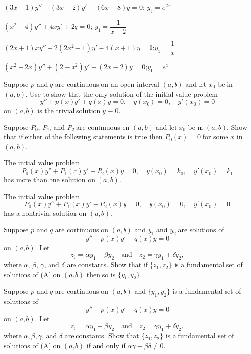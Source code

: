 \begin{exerciselist}
\item\label{exer:5.1.20}$(3x-1)y''-(3x+2)y'-(6x-8)y=0$;  \quad  $y_1=e^{2x}$

\item\label{exer:5.1.21}$(x^2-4)y''+4xy'+2y=0$;  \quad  $y_1=\dfrac{1}{x-2}$

\item\label{exer:5.1.22}$(2x+1)xy''-2(2x^2-1)y'-4(x+1)y=0$;\quad  $y_1=\dfrac{1}{x}$

\item\label{exer:5.1.23}$(x^2-2x)y''+(2-x^2)y'+(2x-2)y=0$;\quad  $y_1=e^x$

\item\label{exer:5.1.24}Suppose  $p$ and $q$ are continuous on an open interval $(a,b)$
and let $x_0$ be in $(a,b)$.
Use    to show that
 the only solution of the initial value problem
\[
y''+p(x)y'+q(x)y=0,\quad  y(x_0)=0,\quad y'(x_0)=0
\]
on  $(a,b)$ is the trivial solution $y\equiv0$.

\item\label{exer:5.1.25}Suppose $P_0$, $P_1$, and $P_2$ are continuous on  $(a,b)$
and let $x_0$ be in  $(a,b)$. Show that if either of
the following statements is true then $P_0(x)=0$ for some $x$ in
$(a,b)$.
\begin{alist}
\item %
The initial value problem
\[
P_0(x)y''+P_1(x)y'+P_2(x)y=0,\quad  y(x_0)=k_0,\quad y'(x_0)=k_1
\]
has more than one  solution on  $(a,b)$.
\item %
The initial value problem
\[
P_0(x)y''+P_1(x)y'+P_2(x)y=0,\quad y(x_0)=0,\quad y'(x_0)=0
\]
has a nontrivial solution on  $(a,b)$.
\end{alist}

\item\label{exer:5.1.26}Suppose  $p$ and $q$ are continuous  on  $(a,b)$ and
 $y_1$ and $y_2$ are solutions of
\[
y''+p(x)y'+q(x)y=0\tag{A}
\]
on  $(a,b)$. Let
\[
z_1=\alpha y_1+\beta y_2\quad\text{and}\quad z_2=\gamma y_1+\delta
y_2,
\]
where $\alpha$, $\beta$, $\gamma$, and $\delta$ are constants.
Show that if  $\{z_1,z_2\}$
is a fundamental set of solutions of
(A) on $(a,b)$ then so is  $\{y_1,y_2\}$.

\item\label{exer:5.1.27}Suppose $p$ and $q$ are continuous on  $(a,b)$ and
$\{y_1,y_2\}$ is a fundamental set of solutions of
\[
y''+p(x)y'+q(x)y=0\tag{A}
\]
on $(a,b)$. Let
\[
z_1=\alpha y_1+\beta y_2\quad\text{and}\quad z_2=\gamma y_1+\delta
y_2,
\]
where $\alpha,\beta,\gamma$, and $\delta$ are constants.
 Show that  $\{z_1,z_2\}$ is a fundamental set of solutions
of (A) on $(a,b)$ if and only if
$ \alpha\gamma-\beta\delta\ne0$.


\end{exerciselist}
